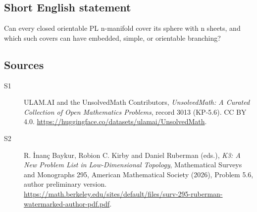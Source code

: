 \documentclass[11pt]{article}
\begin{document}
\subsection{Short English statement}
Can every closed orientable PL n-manifold cover its sphere with n sheets, and which such covers can have embedded, simple, or orientable branching?
\subsection{Sources}
\begin{description}
\item[\hypertarget{source:3013:1}{S1}] ULAM.AI and the UnsolvedMath Contributors, \emph{UnsolvedMath: A Curated Collection of Open Mathematics Problems}, record 3013 (KP-5.6). CC BY 4.0. \url{https://huggingface.co/datasets/ulamai/UnsolvedMath}.
\item[\hypertarget{source:3013:2}{S2}] R. İnanç Baykur, Robion C. Kirby and Daniel Ruberman (eds.), \emph{K3: A New Problem List in Low-Dimensional Topology}, Mathematical Surveys and Monographs 295, American Mathematical Society (2026), Problem 5.6, author preliminary version. \url{https://math.berkeley.edu/sites/default/files/surv-295-ruberman-watermarked-author-pdf.pdf}.
\end{description}
\label{end:3013}
\end{document}
